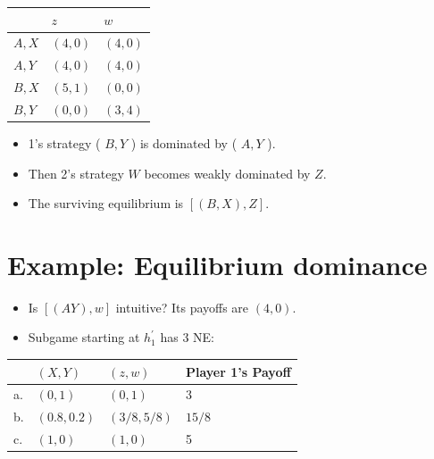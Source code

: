 \documentclass[10pt]{article}
\begin{document}
\begin{center}
\begin{tabular}{lll}
 & $z$ & $w$ \\
\hline
$A, X$ & $(4,0)$ & $(4,0)$ \\
\hline
$A, Y$ & $(4,0)$ & $(4,0)$ \\
\hline
$B, X$ & $(5,1)$ & $(0,0)$ \\
\hline
$B, Y$ & $(0,0)$ & $(3,4)$ \\
\hline
\end{tabular}
\end{center}

\begin{itemize}
  \item 1's strategy ( $B, Y$ ) is dominated by ( $A, Y$ ).
  \item Then 2's strategy $W$ becomes weakly dominated by $Z$.
  \item The surviving equilibrium is $[(B, X), Z]$.
\end{itemize}

\section*{Example: Equilibrium dominance}
\begin{itemize}
  \item Is $[(A Y), w]$ intuitive? Its payoffs are $(4,0)$.
  \item Subgame starting at $h_{1}^{\prime}$ has 3 NE:
\end{itemize}

\begin{center}
\begin{tabular}{llll}
 & $(X, Y)$ & $(z, w)$ & Player 1's Payoff \\
\hline
a. & $(0,1)$ & $(0,1)$ & 3 \\
\hline
b. & $(0.8,0.2)$ & $(3 / 8,5 / 8)$ & $15 / 8$ \\
\hline
c. & $(1,0)$ & $(1,0)$ & 5 \\
\hline
\end{tabular}
\end{center}
\end{document}
